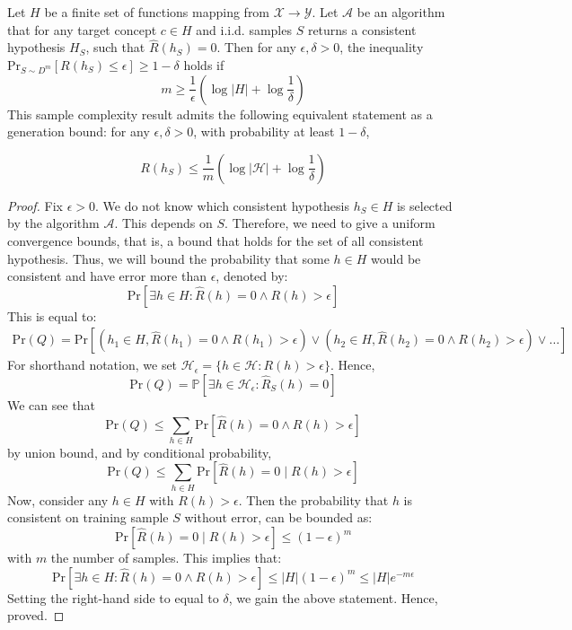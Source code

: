 \begin{theorem}
    Let $H$ be a finite set of functions mapping from $\mathcal{X}\to \mathcal{Y}$. Let $\mathcal{A}$ be an algorithm that for any target concept $c\in H$ and i.i.d. samples $S$ returns a consistent hypothesis $H_{S}$, such that $\hat{R}(h_{S}) = 0$. Then for any  $\epsilon,\delta>0$, the inequality $\mathrm{Pr}_{S\sim D^{m}}[R(h_{S})\leq \epsilon]\geq 1-\delta$ holds if $$m\geq \frac{1}{\epsilon}\left( \log{\lvert H \rvert }+\log{\frac{1}{\delta}} \right)$$
This sample complexity result admits the following equivalent statement as a generation bound: for any $\epsilon,\delta>0$, with probability at least $1-\delta$, 

\begin{equation}
    R(h_S) \leq \frac{1}{m} \left( \log{|\mathcal{H}|} + \log{\frac{1}{\delta}} \right)
\end{equation}
\end{theorem}


\begin{proof}
    Fix $\epsilon>0$. We do not know which consistent hypothesis $h_{S}\in H$ is selected by the algorithm $\mathcal{A}$. This depends on $S$. Therefore, we need to give a uniform convergence bounds, that is, a bound that holds for the set of all consistent hypothesis. Thus, we will bound the probability that some $h\in H$ would be consistent and have error more than $\epsilon$, denoted by: $$\mathrm{Pr}[\exists h\in H: \hat{R}(h)=0 \land R(h) > \epsilon]$$
This is equal to: 
\begin{multline*}
    \mathrm{Pr}(Q)=\mathrm{Pr}[(h_{1}\in H, \hat{R}(h_{1}) = 0 \land R(h_{1}) > \epsilon) \lor (h_{2}\in H, \hat{R}(h_{2}) = 0 \land R(h_{2}) > \epsilon)\lor\dots]
\end{multline*}
For shorthand notation, we set $\mathcal{H}_{\epsilon}=\{ h\in \mathcal{H} : R(h) > \epsilon \}$. Hence, 
\begin{equation*}
    \mathrm{Pr}(Q)=\mathbb{P}[\exists h\in \mathcal{H}_{\epsilon}: \hat{R}_{S}(h) = 0]
\end{equation*}
We can see that $$\mathrm{Pr}(Q)\leq \sum_{h\in H} \mathrm{Pr}[\hat{R}(h) = 0 \land R(h) > \epsilon]$$
by union bound, and by conditional probability, $$\mathrm{Pr}(Q)\leq \sum_{h\in H} \mathrm{Pr}[\hat{R}(h) = 0 \mid R(h) > \epsilon]$$
Now, consider any $h\in H$ with $R(h)>\epsilon$. Then the probability that $h$ is consistent on training sample $S$ without error, can be bounded as: $$\mathrm{Pr}[\hat{R}(h)=0 \mid R(h) > \epsilon] \leq (1-\epsilon)^{m}$$
with $m$ the number of samples. This implies that: $$\mathrm{Pr}[\exists h\in H: \hat{R}(h)=0 \land R(h) > \epsilon]\leq \lvert H \rvert (1-\epsilon)^{m}\leq \lvert H \rvert e^{-m\epsilon}$$
Setting the right-hand side to equal to $\delta$, we gain the above statement. Hence, proved. 
\end{proof}


